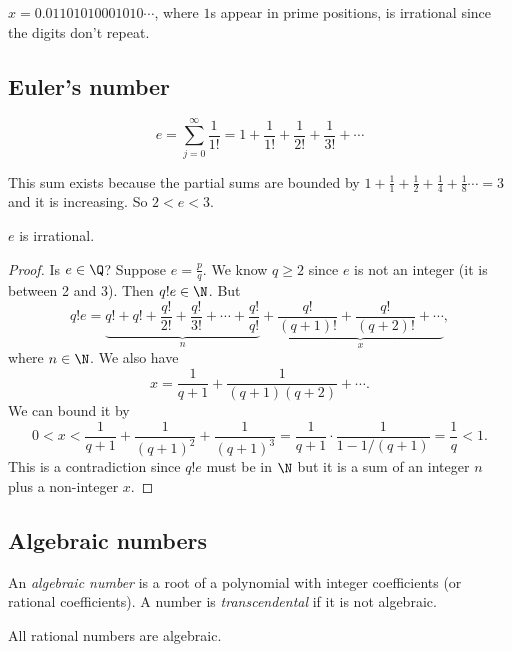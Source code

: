 \documentclass[a4paper]{article}
\begin{document}
  \begin{eg}
    $x = 0.01101010001010\cdots$, where $1$s appear in prime positions, is irrational since the digits don't repeat.
  \end{eg}
  \subsection{Euler's number}
  \begin{defi}
    \[
      e = \sum_{j=0}^\infty \frac{1}{1!} = 1 + \frac{1}{1!} + \frac{1}{2!} + \frac{1}{3!} + \cdots
    \]
  \end{defi}
  \note This sum exists because the partial sums are bounded by $1 + \frac{1}{1} + \frac{1}{2} + \frac{1}{4} + \frac{1}{8}\cdots = 3$ and it is increasing. So $2 < e < 3$.

  \begin{prop}
    $e$ is irrational.
  \end{prop}

  \begin{proof}
    Is $e\in \Q$? Suppose $e = \frac{p}{q}$. We know $q\geq 2$ since $e$ is not an integer (it is between 2 and 3). Then $q!e \in \N$. But
    \[
      q!e = \underbrace{q! + q! + \frac{q!}{2!} + \frac{q!}{3!} + \cdots + \frac{q!}{q!}}_{n} + \underbrace{\frac{q!}{(q + 1)!} + \frac{q!}{(q + 2)!} + \cdots}_{x},
    \]
    where $n \in \N$. We also have
    \[
      x = \frac{1}{q + 1} + \frac{1}{(q + 1)(q + 2)} + \cdots.
    \]
    We can bound it by
    \[
      0 < x < \frac{1}{q+1} +\frac{1}{(q + 1)^2} + \frac{1}{(q + 1)^3} = \frac{1}{q + 1}\cdot \frac{1}{1 - 1/(q + 1)} = \frac{1}{q} < 1.
    \]
    This is a contradiction since $q!e$ must be in $\N$ but it is a sum of an integer $n$ plus a non-integer $x$.
  \end{proof}

  \subsection{Algebraic numbers}
  \begin{defi}
    An \emph{algebraic number} is a root of a polynomial with integer coefficients (or rational coefficients). A number is \emph{transcendental} if it is not algebraic.
  \end{defi}

  \begin{prop}
    All rational numbers are algebraic.
  \end{prop}
\end{document}
